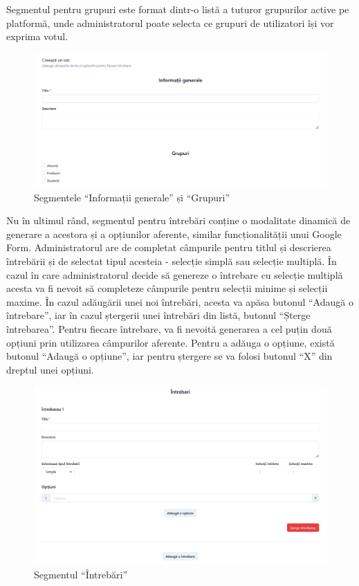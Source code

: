 Segmentul pentru grupuri este format dintr-o listă a tuturor grupurilor active pe platformă, unde administratorul poate selecta ce grupuri de utilizatori își vor exprima votul.

\begin{figure}[!ht]
    \centering
    \includegraphics[width=145mm]{images/create_vote1.png}
    \caption{Segmentele \enquote{Informații generale} și \enquote{Grupuri}}
\end{figure}

Nu în ultimul rând, segmentul pentru întrebări conține o modalitate dinamică de generare a acestora și a opțiunilor aferente, similar funcționalității unui Google Form. Administratorul are de completat câmpurile pentru titlul și descrierea întrebării și de selectat tipul acesteia - selecție simplă sau selecție multiplă. În cazul în care administratorul decide să genereze o întrebare cu selecție multiplă acesta va fi nevoit să completeze câmpurile pentru selecții minime și selecții maxime. În cazul adăugării unei noi întrebări, acesta va apăsa butonul \enquote{Adaugă o întrebare}, iar în cazul ștergerii unei întrebări din listă, butonul \enquote{Șterge întrebarea}. Pentru fiecare întrebare, va fi nevoită generarea a cel puțin două opțiuni prin utilizarea câmpurilor aferente. Pentru a adăuga o opțiune, există butonul \enquote{Adaugă o opțiune}, iar pentru ștergere se va folosi butonul \enquote{X} din dreptul unei opțiuni.

\begin{figure}[!ht]
    \centering
    \includegraphics[width=135mm]{images/create_vote2.png}
    \caption{Segmentul \enquote{Întrebări}}
\end{figure}

